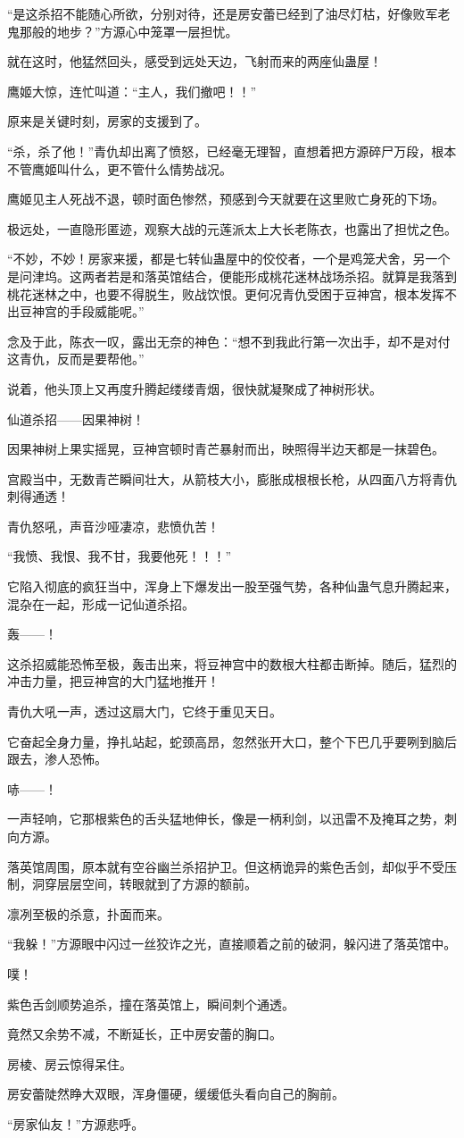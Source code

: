 \begin{this_body}
“是这杀招不能随心所欲，分别对待，还是房安蕾已经到了油尽灯枯，好像败军老鬼那般的地步？”方源心中笼罩一层担忧。

就在这时，他猛然回头，感受到远处天边，飞射而来的两座仙蛊屋！

鹰姬大惊，连忙叫道：“主人，我们撤吧！！”

原来是关键时刻，房家的支援到了。

“杀，杀了他！”青仇却出离了愤怒，已经毫无理智，直想着把方源碎尸万段，根本不管鹰姬叫什么，更不管什么情势战况。

鹰姬见主人死战不退，顿时面色惨然，预感到今天就要在这里败亡身死的下场。

极远处，一直隐形匿迹，观察大战的元莲派太上大长老陈衣，也露出了担忧之色。

“不妙，不妙！房家来援，都是七转仙蛊屋中的佼佼者，一个是鸡笼犬舍，另一个是问津坞。这两者若是和落英馆结合，便能形成桃花迷林战场杀招。就算是我落到桃花迷林之中，也要不得脱生，败战饮恨。更何况青仇受困于豆神宫，根本发挥不出豆神宫的手段威能呢。”

念及于此，陈衣一叹，露出无奈的神色：“想不到我此行第一次出手，却不是对付这青仇，反而是要帮他。”

说着，他头顶上又再度升腾起缕缕青烟，很快就凝聚成了神树形状。

仙道杀招——因果神树！

因果神树上果实摇晃，豆神宫顿时青芒暴射而出，映照得半边天都是一抹碧色。

宫殿当中，无数青芒瞬间壮大，从箭枝大小，膨胀成根根长枪，从四面八方将青仇刺得通透！

青仇怒吼，声音沙哑凄凉，悲愤仇苦！

“我愤、我恨、我不甘，我要他死！！！”

它陷入彻底的疯狂当中，浑身上下爆发出一股至强气势，各种仙蛊气息升腾起来，混杂在一起，形成一记仙道杀招。

轰——！

这杀招威能恐怖至极，轰击出来，将豆神宫中的数根大柱都击断掉。随后，猛烈的冲击力量，把豆神宫的大门猛地推开！

青仇大吼一声，透过这扇大门，它终于重见天日。

它奋起全身力量，挣扎站起，蛇颈高昂，忽然张开大口，整个下巴几乎要咧到脑后跟去，渗人恐怖。

哧——！

一声轻响，它那根紫色的舌头猛地伸长，像是一柄利剑，以迅雷不及掩耳之势，刺向方源。

落英馆周围，原本就有空谷幽兰杀招护卫。但这柄诡异的紫色舌剑，却似乎不受压制，洞穿层层空间，转眼就到了方源的额前。

凛冽至极的杀意，扑面而来。

“我躲！”方源眼中闪过一丝狡诈之光，直接顺着之前的破洞，躲闪进了落英馆中。

噗！

紫色舌剑顺势追杀，撞在落英馆上，瞬间刺个通透。

竟然又余势不减，不断延长，正中房安蕾的胸口。

房棱、房云惊得呆住。

房安蕾陡然睁大双眼，浑身僵硬，缓缓低头看向自己的胸前。

“房家仙友！”方源悲呼。

\end{this_body}

